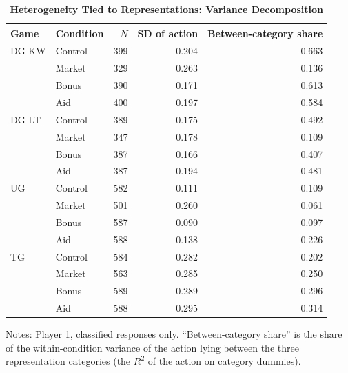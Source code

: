 \begin{table}[!htbp]
\centering
\small
\renewcommand{\arraystretch}{1.15}
\caption{\textbf{Heterogeneity Tied to Representations: Variance Decomposition}}
\label{tab:heterogeneity_decomposition}
\begin{tabular}{ll rrr}
\toprule
Game & Condition & $N$ & SD of action & Between-category share \\
\midrule
DG-KW & Control & 399 & 0.204 & 0.663 \\
 & Market & 329 & 0.263 & 0.136 \\
 & Bonus & 390 & 0.171 & 0.613 \\
 & Aid & 400 & 0.197 & 0.584 \\
DG-LT & Control & 389 & 0.175 & 0.492 \\
 & Market & 347 & 0.178 & 0.109 \\
 & Bonus & 387 & 0.166 & 0.407 \\
 & Aid & 387 & 0.194 & 0.481 \\
UG & Control & 582 & 0.111 & 0.109 \\
 & Market & 501 & 0.260 & 0.061 \\
 & Bonus & 587 & 0.090 & 0.097 \\
 & Aid & 588 & 0.138 & 0.226 \\
TG & Control & 584 & 0.282 & 0.202 \\
 & Market & 563 & 0.285 & 0.250 \\
 & Bonus & 589 & 0.289 & 0.296 \\
 & Aid & 588 & 0.295 & 0.314 \\
\bottomrule
\end{tabular}
\begin{flushleft}
\footnotesize Notes: Player 1, classified responses only. ``Between-category share'' is the share of the within-condition variance of the action lying between the three representation categories (the $R^2$ of the action on category dummies).
\end{flushleft}
\end{table}
